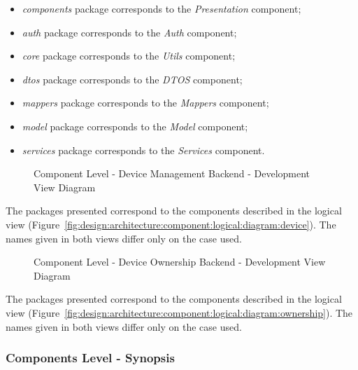 \begin{itemize}
   \item \textit{components} package corresponds to the \textit{Presentation} component;
   \item \textit{auth} package corresponds to the \textit{Auth} component;
   \item \textit{core} package corresponds to the \textit{Utils} component;
   \item \textit{dtos} package corresponds to the \textit{DTOS} component;
   \item \textit{mappers} package corresponds to the \textit{Mappers} component;
   \item \textit{model} package corresponds to the \textit{Model} component;
   \item \textit{services} package corresponds to the \textit{Services} component.
\end{itemize}

\begin{figure}[H]
   \centering
   \resizebox{\columnwidth}{!}
   {
      
   }
   \caption[Component Level - Device Management Backend - Development View Diagram]{Component Level - Device Management Backend - Development View Diagram}
   \label{fig:design:architecture:component:development:diagram:device}
\end{figure}

The packages presented correspond to the components described in the logical view (Figure~\ref{fig:design:architecture:component:logical:diagram:device}). The names given in both views differ only on the case used.

\begin{figure}[H]
   \centering
   \resizebox{\columnwidth}{!}
   {
      
   }
   \caption[Component Level - Device Ownership Backend - Development View Diagram]{Component Level - Device Ownership Backend - Development View Diagram}
   \label{fig:design:architecture:component:development:diagram:ownership}
\end{figure}

The packages presented correspond to the components described in the logical view (Figure~\ref{fig:design:architecture:component:logical:diagram:ownership}). The names given in both views differ only on the case used.

\subsubsection*{Components Level - Synopsis}
\label{subsubsec:design:architecture:components:synopsis}

